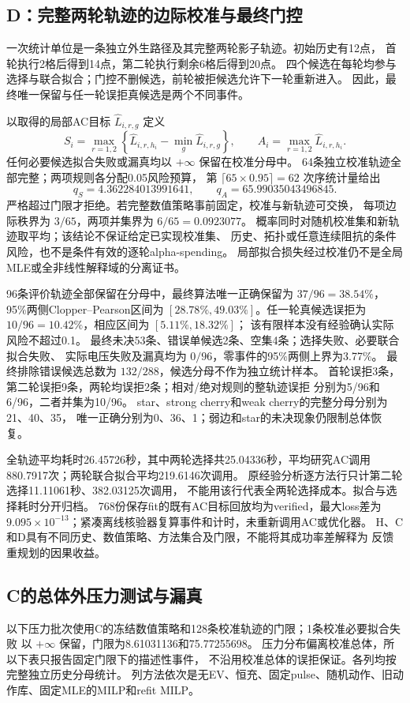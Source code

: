 \subsection{D：完整两轮轨迹的边际校准与最终门控}
\label{sec:D-audited}
一次统计单位是一条独立外生路径及其完整两轮影子轨迹。初始历史有12点，
首轮执行2格后得到14点，第二轮执行剩余6格后得到20点。
四个候选在每轮均参与选择与联合拟合；门控不删候选，前轮被拒候选允许下一轮重新进入。
因此，最终唯一保留与任一轮误拒真候选是两个不同事件。

以取得的局部AC目标 $\widehat L_{i,r,g}$ 定义
\[
 S_i=\max_{r=1,2}\left\{\widehat L_{i,r,h_i}-\min_g\widehat L_{i,r,g}\right\},
 \qquad A_i=\max_{r=1,2}\widehat L_{i,r,h_i}.
\]
任何必要候选拟合失败或漏真均以 $+\infty$ 保留在校准分母中。
64条独立校准轨迹全部完整；两项规则各分配0.05风险预算，
第 $\lceil65\times0.95\rceil=62$ 次序统计量给出
\[
 q_S=4.362284013991641,\qquad q_A=65.99035043496845.
\]
严格超过门限才拒绝。若完整数值策略事前固定，校准与新轨迹可交换，
每项边际秩界为 $3/65$，两项并集界为 $6/65=0.0923077$。
概率同时对随机校准集和新轨迹取平均；该结论不保证给定已实现校准集、
历史、拓扑或任意连续阻抗的条件风险，也不是条件有效的逐轮alpha-spending。
局部拟合损失经过校准仍不是全局MLE或全非线性解释域的分离证书。

96条评价轨迹全部保留在分母中，最终算法唯一正确保留为
$37/96=38.54\%$，95\%两侧Clopper--Pearson区间为
$[28.78\%,49.03\%]$。任一轮真候选误拒为
$10/96=10.42\%$，相应区间为 $[5.11\%,18.32\%]$；
该有限样本没有经验确认实际风险不超过0.1。
最终未决53条、错误单候选2条、空集4条；选择失败、必要联合拟合失败、
实际电压失败及漏真均为 $0/96$，零事件的95\%两侧上界为3.77\%。
最终排除错误候选总数为 $132/288$，候选分母不作为独立统计样本。
首轮误拒3条，第二轮误拒9条，两轮均误拒2条；相对/绝对规则的整轨迹误拒
分别为5/96和6/96，二者并集为10/96。
star、strong cherry和weak cherry的完整分母分别为21、40、35，
唯一正确分别为0、36、1；弱边和star的未决现象仍限制总体恢复。

全轨迹平均耗时26.45726秒，其中两轮选择共25.04336秒，平均研究AC调用
880.7917次；两轮联合拟合平均219.6146次调用。
原经验分析逐方法行只计第二轮选择11.11061秒、382.03125次调用，
不能用该行代表全两轮选择成本。拟合与选择耗时分开归档。
768份保存fit的既有AC目标回放均为verified，最大loss差为
$9.095\times10^{-13}$；紧凑离线核验器复算事件和计时，未重新调用AC或优化器。
H、C和D具有不同历史、数值策略、方法集合及门限，不能将其成功率差解释为
反馈重规划的因果收益。

\subsection{C的总体外压力测试与漏真}
\label{sec:stress-audited}
以下压力批次使用C的冻结数值策略和128条校准轨迹的门限；1条校准必要拟合失败
以 $+\infty$ 保留，门限为8.61031136和75.77255698。
压力分布偏离校准总体，所以下表只报告固定门限下的描述性事件，
不沿用校准总体的误拒保证。各列均按完整独立历史分母统计。
列方法依次是无EV、恒充、固定pulse、随机动作、旧动作库、固定MLE的MILP和refit MILP。

